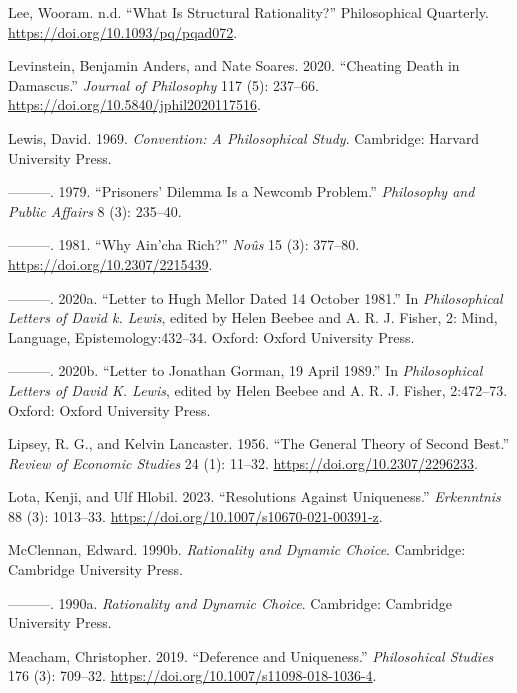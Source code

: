 \documentclass[
  12pt,
  letterpaper,
  DIV=11,
  numbers=noendperiod]{scrreprt}
\newlength{\cslhangindent}
\newenvironment{CSLReferences}[2] %
 {\begin{list}{}{%
  \setlength{\itemindent}{0pt}
  \setlength{\leftmargin}{0pt}
  \setlength{\parsep}{0pt}
  \ifodd #1
   \setlength{\leftmargin}{\cslhangindent}
   \setlength{\itemindent}{-1\cslhangindent}
  \fi
  \setlength{\itemsep}{#2\baselineskip}}}
 {\end{list}}
\begin{document}
\begin{CSLReferences}{1}{0}
Lee, Wooram. n.d. {``What Is Structural Rationality?''} Philosophical
Quarterly. \url{https://doi.org/10.1093/pq/pqad072}.

Levinstein, Benjamin Anders, and Nate Soares. 2020. {``Cheating Death in
Damascus.''} \emph{Journal of Philosophy} 117 (5): 237--66.
\url{https://doi.org/10.5840/jphil2020117516}.

Lewis, David. 1969. \emph{Convention: A Philosophical Study}. Cambridge:
Harvard University Press.

---------. 1979. {``Prisoners' Dilemma Is a {N}ewcomb Problem.''}
\emph{Philosophy and Public Affairs} 8 (3): 235--40.

---------. 1981. {``Why Ain'cha Rich?''} \emph{No{û}s} 15 (3): 377--80.
\url{https://doi.org/10.2307/2215439}.

---------. 2020a. {``Letter to Hugh Mellor Dated 14 October 1981.''} In
\emph{Philosophical Letters of David k. Lewis}, edited by Helen Beebee
and A. R. J. Fisher, 2: Mind, Language, Epistemology:432--34. Oxford:
Oxford University Press.

---------. 2020b. {``Letter to Jonathan Gorman, 19 April 1989.''} In
\emph{Philosophical Letters of David {K}. Lewis}, edited by Helen Beebee
and A. R. J. Fisher, 2:472--73. Oxford: Oxford University Press.

Lipsey, R. G., and Kelvin Lancaster. 1956. {``The General Theory of
Second Best.''} \emph{Review of Economic Studies} 24 (1): 11--32.
\url{https://doi.org/10.2307/2296233}.

Lota, Kenji, and Ulf Hlobil. 2023. {``Resolutions Against Uniqueness.''}
\emph{Erkenntnis} 88 (3): 1013--33.
\url{https://doi.org/10.1007/s10670-021-00391-z}.

McClennan, Edward. 1990b. \emph{Rationality and Dynamic Choice}.
Cambridge: {C}ambridge {U}niversity {P}ress.

---------. 1990a. \emph{Rationality and Dynamic Choice}. Cambridge:
Cambridge University Press.

Meacham, Christopher. 2019. {``Deference and Uniqueness.''}
\emph{Philosohical Studies} 176 (3): 709--32.
\url{https://doi.org/10.1007/s11098-018-1036-4}.


\end{CSLReferences}
\end{document}
